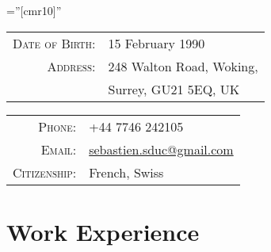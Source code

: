 \documentclass[a4paper,10pt]{article} %
\begin{document}
\pagestyle{empty} %

\font\fb=''[cmr10]'' %


\par{\par} %


\begin{tabular}{rl}
\textsc{Date of Birth:} & 15 February 1990 \\
\textsc{Address:} & 248 Walton Road, Woking,\\ 
                  & Surrey, GU21 5EQ, UK \\
\end{tabular}
\quad\quad\quad\quad\quad
\begin{tabular}{rl}
\textsc{Phone:} & +44 7746 242105\\
\textsc{Email:} & \href{mailto:sebastien.sduc@gmail.com}{sebastien.sduc@gmail.com}\\
\textsc{Citizenship:} & French, Swiss
\end{tabular}


\section{Work Experience}
\end{document}
